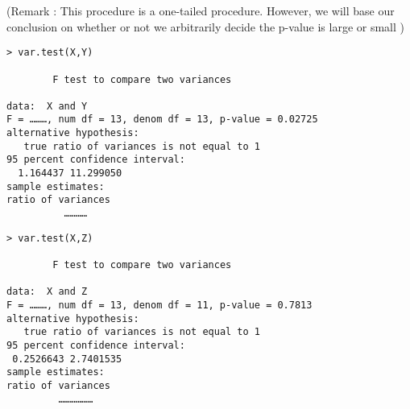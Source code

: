\documentclass[a4paper,12pt]{article}
\begin{document}
(Remark : This procedure is a one-tailed procedure. However, we will base our conclusion on whether or not we arbitrarily decide the p-value is large or small )
\begin{framed}
\begin{verbatim}
> var.test(X,Y)

        F test to compare two variances

data:  X and Y
F = ………, num df = 13, denom df = 13, p-value = 0.02725
alternative hypothesis: 
   true ratio of variances is not equal to 1 
95 percent confidence interval:
  1.164437 11.299050 
sample estimates:
ratio of variances 
          ………… 
\end{verbatim}
\end{framed}
\begin{framed}
\begin{verbatim}
> var.test(X,Z)

        F test to compare two variances

data:  X and Z 
F = ………, num df = 13, denom df = 11, p-value = 0.7813
alternative hypothesis: 
   true ratio of variances is not equal to 1 
95 percent confidence interval:
 0.2526643 2.7401535 
sample estimates:
ratio of variances 
         ………………
\end{verbatim}
\end{framed}
%
%
\newpage
\end{document}
